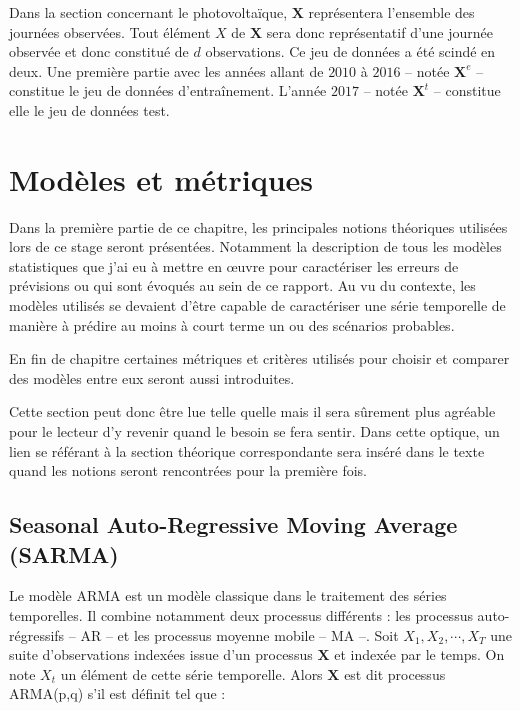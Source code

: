 \documentclass[12pt, french]{report}
\begin{document}
\newpage
Dans la section concernant le photovoltaïque, $\bm{X}$ représentera l'ensemble des journées observées. Tout élément $X$ de $\bm{X}$ sera donc représentatif d'une journée observée et donc constitué de $d$ observations. Ce jeu de données a été scindé en deux. Une première partie avec les années allant de $2010$ à $2016$ -- notée $\bm{X}^e$ -- constitue le jeu de données d'entraînement. L'année $2017$ -- notée $\bm{X}^t$ -- constitue elle le jeu de données test.  


\pagestyle{corpus}
\chapter{Modèles et métriques}
Dans la première partie de ce chapitre, les principales notions théoriques utilisées lors de ce stage seront présentées. Notamment la description de tous les modèles statistiques que j'ai eu à mettre en œuvre pour caractériser les erreurs de prévisions ou qui sont évoqués au sein de ce rapport. Au vu du contexte, les modèles utilisés se devaient d'être capable de caractériser une série temporelle de manière à prédire au moins à court terme un ou des scénarios probables.

En fin de chapitre certaines métriques et critères utilisés pour choisir et comparer des modèles entre eux seront aussi introduites.

Cette section peut donc être lue telle quelle mais il sera sûrement plus agréable pour le lecteur d'y revenir quand le besoin se fera sentir. Dans cette optique, un lien se référant à la section théorique correspondante sera inséré dans le texte quand les notions seront rencontrées pour la première fois.

\section{Seasonal Auto-Regressive Moving Average (SARMA)}
\label{sec:Model_SARMA}

Le modèle ARMA est un modèle classique dans le traitement des séries temporelles. Il combine  notamment deux processus différents : les processus auto-régressifs -- AR -- et les processus moyenne mobile -- MA --. Soit $X_1,X_2,\cdots,X_T$ une suite d'observations indexées issue d'un processus $\bm{X}$ et indexée par le temps. On note $X_t$ un élément de cette série temporelle. Alors $\bm{X}$ est dit processus ARMA(p,q) s'il est définit tel que : 
\end{document}
